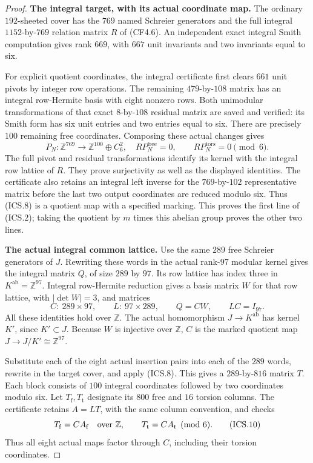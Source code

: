 \begin{proof}
\par\medskip\noindent\textbf{The integral target, with its actual coordinate map.}\quad
The ordinary $192$-sheeted cover has the $769$ named Schreier
generators and the full integral $1152$-by-$769$ relation matrix
$R$ of (CF4.6). An independent exact integral Smith computation
gives rank $669$, with $667$ unit invariants and two invariants
equal to six.

For explicit quotient coordinates, the integral certificate first
clears $661$ unit pivots by integer row operations. The remaining
$479$-by-$108$ matrix has an integral row-Hermite basis with eight
nonzero rows. Both unimodular transformations of that exact
$8$-by-$108$ residual matrix are saved and verified: its Smith
form has six unit entries and two entries equal to six. There
are precisely $100$ remaining free coordinates. Composing these
actual changes gives
\[
 P_N:\mathbb Z^{769}\longrightarrow
          \mathbb Z^{100}\oplus C_6^2,
 \quad
 RP_N^{\mathrm{free}}=0,\qquad RP_N^{\mathrm{tors}}=0\pmod6.
                                                        \tag{ICS.8}
\]
The full pivot and residual transformations identify its kernel
with the integral row lattice of $R$. They prove surjectivity as
well as the displayed identities. The certificate also retains
an integral left inverse for the $769$-by-$102$ representative
matrix before the last two output coordinates are reduced modulo
six. Thus (ICS.8) is a quotient map with a specified marking.
This proves the first line of (ICS.2); taking the quotient by
$m$ times this abelian group proves the other two lines.

\par\medskip\noindent\textbf{The actual integral common lattice.}\quad
Use the same $289$ free Schreier generators of $J$. Rewriting
these words in the actual rank-$97$ modular kernel gives the
integral matrix $Q$, of size $289$ by $97$. Its row lattice
has index three in $K^{\mathrm{ab}}=\mathbb Z^{97}$.
Integral row-Hermite reduction gives a basis matrix $W$ for
that row lattice, with $|\det W|=3$, and matrices
\[
 C:\ 289\times97,\qquad L:\ 97\times289,
 \qquad Q=CW,\qquad LC=I_{97}.
                                                        \tag{ICS.9}
\]
All these identities hold over $\mathbb Z$.
The actual homomorphism $J\to K^{\mathrm{ab}}$ has kernel
$K'$, since $K'\subset J$. Because $W$ is injective over
$\mathbb Z$, $C$ is the marked quotient map
$J\to J/K'\cong\mathbb Z^{97}$.

Substitute each of the eight actual insertion pairs into
each of the $289$ words, rewrite in the target cover, and
apply (ICS.8). This gives a $289$-by-$816$ matrix $T$.
Each block consists of $100$ integral coordinates followed
by two coordinates modulo six. Let $T_{\mathrm f},T_{\mathrm t}$ designate its
$800$ free and $16$ torsion columns. The certificate retains
$A=LT$, with the same column convention, and checks
\[
                  T_{\mathrm f}=CA_{\mathrm f}\quad\hbox{over }\mathbb Z,
 \qquad           T_{\mathrm t}=CA_{\mathrm t}\pmod6.
                                                        \tag{ICS.10}
\]
Thus all eight actual maps factor through $C$, including
their torsion coordinates.


\end{proof}
